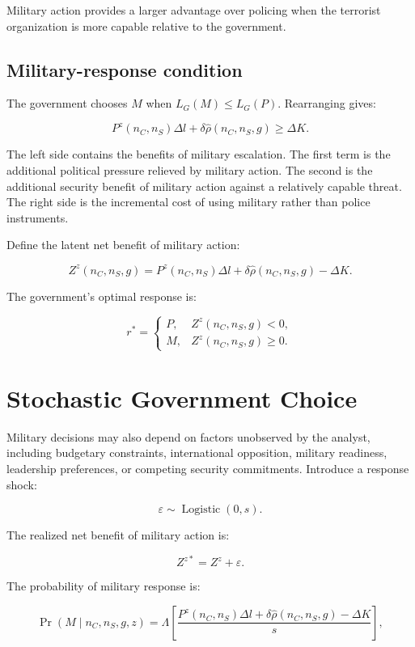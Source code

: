 \documentclass[
  letterpaper,
  DIV=11,
  numbers=noendperiod]{scrartcl}
\begin{document}
Military action provides a larger advantage over policing when the
terrorist organization is more capable relative to the government.

\subsection{Military-response
condition}\label{military-response-condition}

The government chooses \(M\) when \(L_G(M)\leq L_G(P)\). Rearranging
gives:

\[
\boxed{
P^z(n_C,n_S)\Delta l
+\delta\widehat{\rho}(n_C,n_S,g)
\geq
\Delta K.
}
\tag{18}
\]

The left side contains the benefits of military escalation. The first
term is the additional political pressure relieved by military action.
The second is the additional security benefit of military action against
a relatively capable threat. The right side is the incremental cost of
using military rather than police instruments.

Define the latent net benefit of military action:

\[
\boxed{
Z^z(n_C,n_S,g)
=
P^z(n_C,n_S)\Delta l
+\delta\widehat{\rho}(n_C,n_S,g)
-\Delta K.
}
\tag{19}
\]

The government's optimal response is:

\[
\boxed{
r^*=
\begin{cases}
P, & Z^z(n_C,n_S,g)<0,\\[4pt]
M, & Z^z(n_C,n_S,g)\geq0.
\end{cases}
}
\tag{20}
\]

\section{Stochastic Government
Choice}\label{stochastic-government-choice}

Military decisions may also depend on factors unobserved by the analyst,
including budgetary constraints, international opposition, military
readiness, leadership preferences, or competing security commitments.
Introduce a response shock:

\[
\varepsilon\sim\operatorname{Logistic}(0,s).
\]

The realized net benefit of military action is:

\[
Z^{z*}=Z^z+\varepsilon.
\]

The probability of military response is:

\[
\boxed{
\Pr(M\mid n_C,n_S,g,z)
=
\Lambda\left[
\frac{P^z(n_C,n_S)\Delta l
+\delta\widehat{\rho}(n_C,n_S,g)
-\Delta K}{s}
\right],
}
\tag{21}
\]
\end{document}
